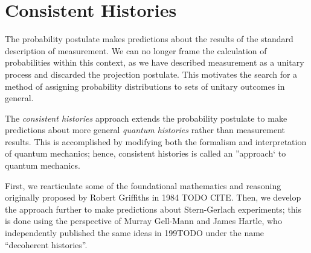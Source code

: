 \usetikzlibrary{shapes.geometric}
\usetikzlibrary{positioning}

\chapter{Consistent Histories}

The probability postulate makes predictions about the results of the standard description of measurement. We can no longer frame the calculation of probabilities within this context, as we have  described measurement as a unitary process and discarded the projection postulate. This motivates the search for a method of assigning probability distributions to sets of unitary outcomes in general.

The \textit{consistent histories} approach extends the probability postulate to make predictions about  more general \textit{quantum histories} rather than measurement results. This is accomplished by modifying both the formalism and interpretation of quantum mechanics; hence, consistent histories is called an ''approach` to quantum mechanics.

First, we rearticulate some of the foundational mathematics and reasoning originally proposed by Robert Griffiths in 1984 TODO CITE. Then, we develop the approach further to make predictions about Stern-Gerlach experiments; this is done using the perspective of Murray Gell-Mann and James Hartle, who independently published the same ideas in 199TODO under the name ``decoherent histories''.

%
%
%
%


